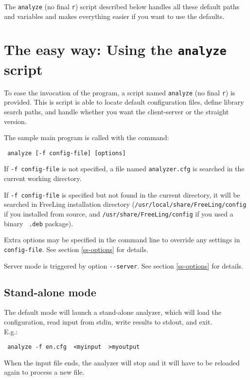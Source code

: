 \documentclass[a4paper]{book}
\begin{document}
  The {\tt analyze} (no final {\tt r}) script described below handles
  all these default paths and variables and makes everything easier if
  you want to use the defaults.

 \section{The easy way: Using the {\tt analyze} script}

  To ease the invocation of the program, a script named {\tt analyze}
  (no final {\tt r}) is provided. This is script is able to locate
  default configuration files, define library search paths, and 
  handle whether you want the client-server or the straight version.

 The sample main program is called with the command:
\begin{verbatim}
 analyze [-f config-file] [options]
\end{verbatim}

  If \verb#-f config-file# is not specified, a file named 
 {\tt analyzer.cfg} is searched in the current working 
 directory. 

  If \verb#-f config-file# is specified but not found in the current
  directory, it will be searched in FreeLing installation directory
  ({\tt /usr/local/share/FreeLing/config} if you installed from
  source, and \verb#/usr/share/FreeLing/config# if you used a binary {\tt
    .deb} package).

  Extra options may be specified in the command line to override any
  settings in \verb#config-file#. See section \ref{ss-options} for
  details.

  Server mode is triggered by option \verb#--server#. See section
  \ref{ss-options} for details.

\subsection{Stand-alone mode}

 The default mode will launch a stand-alone analyzer, which will load
 the configuration, read input from stdin, write results to stdout,
 and exit.\\ E.g.:
\begin{verbatim}
 analyze -f en.cfg  <myinput  >myoutput
\end{verbatim}

  When the input file ends, the analyzer will stop and it will have to be
  reloaded again to process a new file.
\end{document}
